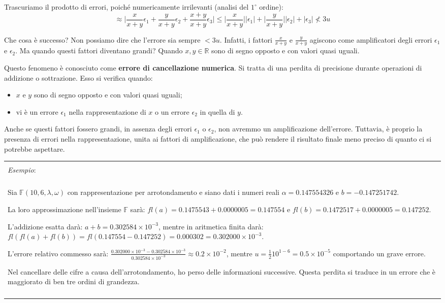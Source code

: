 \documentclass{article}
\numberwithin{equation}{section}
\newenvironment{example}
{\begin{center}
        \begin{tabular}{|p{0.9\textwidth}|}
            \hline \\ 
            \textit{Esempio}: \\\\ 
        }
        {
            \\\\ \hline
        \end{tabular}
    \end{center}
}
\begin{document}
\begin{itemize}
        Trascuriamo il prodotto di errori, poiché numericamente irrilevanti
        (analisi del $1^{\circ}$ ordine):
        $$\approx \Big\lvert
        \frac{x}{x+y}\epsilon_1+\frac{y}{x+y}\epsilon_2+\frac{x+y}{x+y}\epsilon_3\Big\rvert\leq
        \Big\lvert \frac{x}{x+y}\Big\rvert\lvert \epsilon_1\rvert+\Big\lvert
        \frac{y}{x+y}\Big\rvert \lvert \epsilon_2\rvert+\lvert
        \epsilon_3\rvert\nless 3u$$

        Che cosa è successo? Non possiamo dire che l'errore sia sempre $<3u$.
        Infatti, i fattori $\frac{x}{x+y}$ e $\frac{y}{x+y}$ agiscono come
        amplificatori degli errori $\epsilon_1$ e $\epsilon_2$. Ma quando questi fattori diventano grandi?
        Quando $x,y\in \mathbb{R}$ sono di segno opposto e con valori quasi
        uguali. 

        Questo fenomeno è conosciuto come \textbf{errore di
        cancellazione numerica}. Si tratta di una perdita di
        precisione durante operazioni di addizione o sottrazione. Esso si
        verifica quando:
        \begin{itemize}
            \item $x$ e $y$ sono di segno opposto e con valori quasi uguali;
            \item vi è un errore $\epsilon_1$ nella rappresentazione di $x$ o
                un errore $\epsilon_2$ in quella di $y$.
        \end{itemize}
        Anche se questi fattori fossero grandi, in assenza degli
        errori $\epsilon_1$ o $\epsilon_2$, non avremmo un amplificazione
        dell'errore. Tuttavia, è proprio la presenza di errori nella
        rappresentazione, unita ai fattori di amplificazione, che può
        rendere il risultato finale meno preciso di quanto ci si potrebbe
        aspettare.
\end{itemize}
\begin{example}
   Sia $\mathbb{F}(10,6,\lambda,\omega)$ con rappresentazione per arrotondamento e siano
   dati i numeri reali $\alpha=0.147554326$ e $b=-0.147251742$. 

   La loro approssimazione nell'insieme $\mathbb{F}$ sarà:
   $fl(a)=0.1475543+0.0000005=0.147554$ e
   $fl(b)=0.1472517+0.0000005=0.147252$.

   L'addizione esatta darà: $a+b=0.302584\times10^{-3}$, mentre in aritmetica
   finita darà:
   $fl(fl(a)+fl(b))=fl(0.147554-0.147252)=0.000302=0.302000\times10^{-3}$.

   L'errore relativo commesso sarà:
   $\frac{0.302000\times10^{-3}-0.302584\times10^{-3}}{0.302584\times10^{-3}}\approx0.2\times10^{-2}$,
   mentre $u=\frac{1}{2}10^{1-6}=0.5\times10^{-5}$ comportando un grave
   errore.

   Nel cancellare delle cifre a causa dell'arrotondamento, ho perso
   delle informazioni successive. Questa perdita si traduce in un errore che è
   maggiorato di ben tre ordini di grandezza. 
\end{example}
\end{document}
